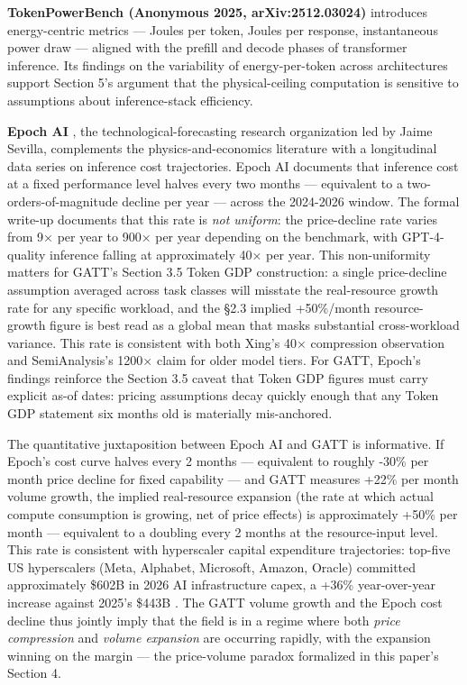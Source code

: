 \documentclass[11pt,a4paper]{article}
\begin{document}
\textbf{TokenPowerBench (Anonymous 2025, arXiv:2512.03024)} \cite{tokenpowerbench2025} introduces energy-centric metrics --- Joules per token, Joules per response, instantaneous power draw --- aligned with the prefill and decode phases of transformer inference. Its findings on the variability of energy-per-token across architectures support Section 5's argument that the physical-ceiling computation is sensitive to assumptions about inference-stack efficiency.

\textbf{Epoch AI} \cite{epoch2026inference}, the technological-forecasting research organization led by Jaime Sevilla, complements the physics-and-economics literature with a longitudinal data series on inference cost trajectories. Epoch AI documents that inference cost at a fixed performance level halves every two months --- equivalent to a two-orders-of-magnitude decline per year --- across the 2024-2026 window. The formal write-up \cite{priceprogress2025} documents that this rate is \emph{not uniform}: the price-decline rate varies from 9× per year to 900× per year depending on the benchmark, with GPT-4-quality inference falling at approximately 40× per year. This non-uniformity matters for GATT's Section 3.5 Token GDP construction: a single price-decline assumption averaged across task classes will misstate the real-resource growth rate for any specific workload, and the §2.3 implied +50\%/month resource-growth figure is best read as a global mean that masks substantial cross-workload variance. This rate is consistent with both Xing's \cite{xing2026token} 40× compression observation and SemiAnalysis's \cite{patel2026semianalysis} 1200× claim for older model tiers. For GATT, Epoch's findings reinforce the Section 3.5 caveat that Token GDP figures must carry explicit as-of dates: pricing assumptions decay quickly enough that any Token GDP statement six months old is materially mis-anchored.

The quantitative juxtaposition between Epoch AI and GATT is informative. If Epoch's cost curve halves every 2 months --- equivalent to roughly -30\% per month price decline for fixed capability --- and GATT measures +22\% per month volume growth, the implied real-resource expansion (the rate at which actual compute consumption is growing, net of price effects) is approximately +50\% per month --- equivalent to a doubling every 2 months at the resource-input level. This rate is consistent with hyperscaler capital expenditure trajectories: top-five US hyperscalers (Meta, Alphabet, Microsoft, Amazon, Oracle) committed approximately \$602B in 2026 AI infrastructure capex, a +36\% year-over-year increase against 2025's \$443B \cite{csis2026tokenbill}. The GATT volume growth and the Epoch cost decline thus jointly imply that the field is in a regime where both \emph{price compression} and \emph{volume expansion} are occurring rapidly, with the expansion winning on the margin --- the price-volume paradox formalized in this paper's Section 4.
\end{document}
